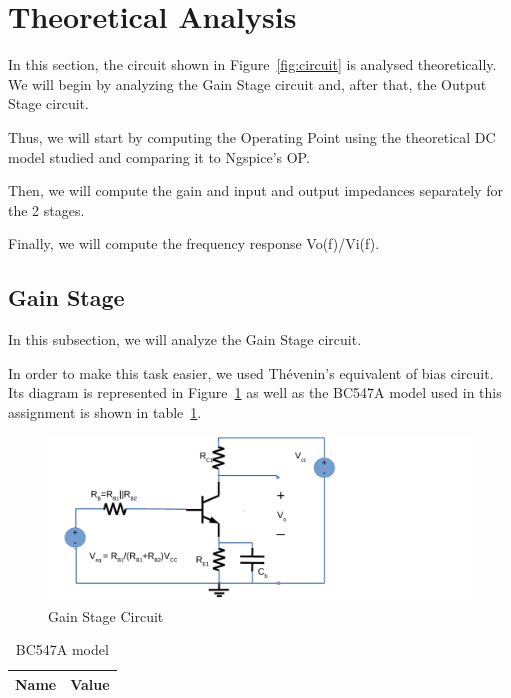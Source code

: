 \section{Theoretical Analysis}
\label{sec:analysis}
In this section, the circuit shown in Figure~\ref{fig:circuit} is analysed
theoretically. We will begin by analyzing the Gain Stage circuit and, after that, the Output Stage circuit.

Thus, we will start by computing the Operating Point using the theoretical DC
model studied and comparing it to Ngspice’s OP.

Then, we will compute the gain and input and output impedances separately for the 2 stages. 

Finally, we will compute the frequency response Vo(f)/Vi(f).

\subsection{Gain Stage}
In this subsection, we will analyze the Gain Stage circuit.

In order to make this task easier, we used Thévenin's equivalent of bias circuit. Its diagram is represented in Figure~\ref{fig:gscircuit} as well as the BC547A model used in this assignment is shown in table~\ref{tab:bgs}.

\begin{figure}[H] \centering
\includegraphics[width=0.8\linewidth]{gainstage.pdf}
\caption{Gain Stage Circuit}                                     %
\label{fig:gscircuit}
\end{figure}


\begin{table}[H]
  \centering
  \begin{tabular}{|l|r|}
     \hline    
    {\bf Name} & {\bf Value} \\ \hline   
    
  \end{tabular}
  \caption{BC547A model}
  \label{tab:bgs}
\end{table}

